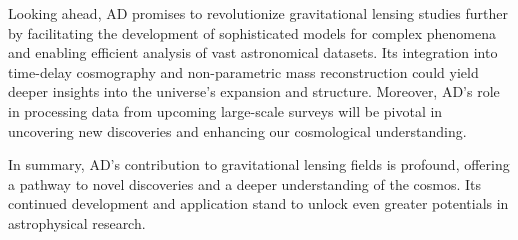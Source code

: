 Looking ahead, AD promises to revolutionize gravitational lensing studies further by facilitating the development of sophisticated models for complex phenomena and enabling efficient analysis of vast astronomical datasets. Its integration into time-delay cosmography and non-parametric mass reconstruction could yield deeper insights into the universe's expansion and structure. Moreover, AD's role in processing data from upcoming large-scale surveys will be pivotal in uncovering new discoveries and enhancing our cosmological understanding.

In summary, AD's contribution to gravitational lensing fields is profound, offering a pathway to novel discoveries and a deeper understanding of the cosmos. Its continued development and application stand to unlock even greater potentials in astrophysical research.